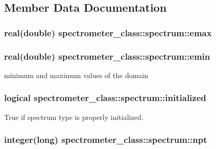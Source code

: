 \subsection{Member Data Documentation}
\hypertarget{structspectrometer__class_1_1spectrum_a19c8c0ef9b07c698ad2ec0f72f0992bf}{
\subsubsection[{emax}]{\setlength{\rightskip}{0pt plus 5cm}real(double) spectrometer\-\_\-class\-::spectrum\-::emax\hspace{0.3cm}{\ttfamily [private]}}}\label{structspectrometer__class_1_1spectrum_a19c8c0ef9b07c698ad2ec0f72f0992bf}
\hypertarget{structspectrometer__class_1_1spectrum_a257027f221a5344e222be1b9336f6c9c}{
\subsubsection[{emin}]{\setlength{\rightskip}{0pt plus 5cm}real(double) spectrometer\-\_\-class\-::spectrum\-::emin\hspace{0.3cm}{\ttfamily [private]}}}\label{structspectrometer__class_1_1spectrum_a257027f221a5344e222be1b9336f6c9c}


minimum and maximum values of the domain 

\hypertarget{structspectrometer__class_1_1spectrum_a81dd1f90a12fcc317ae95c3855aa3d29}{
\subsubsection[{initialized}]{\setlength{\rightskip}{0pt plus 5cm}logical spectrometer\-\_\-class\-::spectrum\-::initialized\hspace{0.3cm}{\ttfamily [private]}}}\label{structspectrometer__class_1_1spectrum_a81dd1f90a12fcc317ae95c3855aa3d29}


True if spectrum type is properly initialized. 

\hypertarget{structspectrometer__class_1_1spectrum_a082d9e0f82565526a83b32fae38df78f}{
\subsubsection[{npt}]{\setlength{\rightskip}{0pt plus 5cm}integer(long) spectrometer\-\_\-class\-::spectrum\-::npt\hspace{0.3cm}{\ttfamily [private]}}}\label{structspectrometer__class_1_1spectrum_a082d9e0f82565526a83b32fae38df78f}


